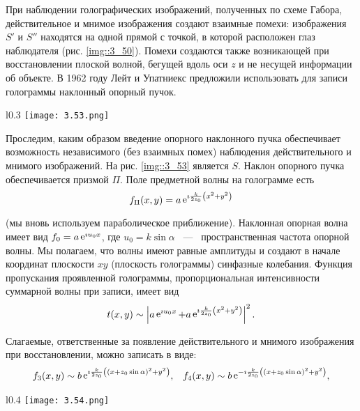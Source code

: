 При наблюдении голографических изображений, полученных по схеме Габора,
действительное и мнимое изображения создают взаимные помехи: изображения 
$S'$ и $S''$ находятся на одной прямой с точкой, в которой расположен глаз наблюдателя (рис. \ref{img::3_50}).
Помехи создаются также возникающей при восстановлении плоской волной, бегущей
вдоль оси $z$ и не несущей информации об объекте. В 1962 году Лейт и Упатниекс предложили использовать для записи голограммы наклонный опорный пучок.

\begin{wrapfigure}{l}{0.3\linewidth}
  \texttt{[image: 3.53.png]}
  \caption{Наклонный опорный пучок}
  \label{img::3_53}
\end{wrapfigure}

Проследим, каким образом введение опорного наклонного пучка обеспечивает 
возможность независимого (без взаимных помех) наблюдения действительного
и мнимого изображений. На рис. \ref{img::3_53}  является 
 $S$. Наклон опорного пучка обеспечивается призмой
$\Pi$. Поле предметной волны на голограмме есть
$$
f_{\Pi}(x, y) = a \mathop{\mathrm e}\nolimits^{\imath \frac{k}{2z_0}\left(x^2+y^2\right)}
$$

(мы вновь используем параболическое приближение). Наклонная опорная волна 
имеет вид $f_0 = a\mathop{\mathrm e}\nolimits^{\imath u_0x}$, где $u_0 = k \sin{\alpha}$ ~---~ 
пространственная частота опорной волны. Мы полагаем, что волны
имеют равные амплитуды и создают в начале координат плоскости $xy$
(плоскость голограммы) синфазные колебания. Функция пропускания
проявленной голограммы, пропорциональная интенсивности суммарной волны при 
записи, имеет вид
$$
t(x, y) \sim 
\left|
a\mathop{\mathrm e}\nolimits^{\imath u_0 x} + a \mathop{\mathrm e}\nolimits^{\imath \frac{k}{2z_0}\left(x^2+y^2\right)}
\right|^2 .
$$

Слагаемые, ответственные за появление действительного и мнимого изображения 
при восстановлении, можно записать в виде:
\begin{align*}
f_3(x, y) \sim
b \mathop{\mathrm e}\nolimits^{\imath \frac{k}{2z_0}
\left(
  \left(
    x + z_0 \sin{\alpha}
  \right)^2
  +y^2
\right)
}, &&
f_4(x, y) \sim
b \mathop{\mathrm e}\nolimits^{ -\imath \frac{k}{2z_0}
  \left(
  \left(
  x + z_0 \sin{\alpha}
  \right)^2
  +y^2
  \right)
},
\end{align*}

\newpage 
\begin{wrapfigure}{l}{0.4\linewidth}
  \texttt{[image: 3.54.png]}
  \caption{Мнимые и действительные изображения в схеме с наклонным пучком}
  \label{img::3_54}
\end{wrapfigure}

